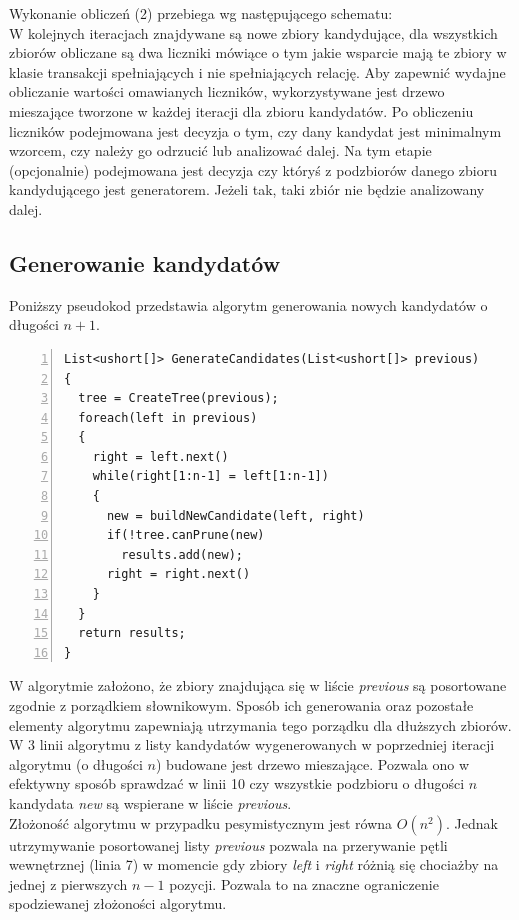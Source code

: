\documentclass[a4paper,12pt]{article}
\begin{document}
Wykonanie obliczeń (2) przebiega wg następującego schematu:\\

W kolejnych iteracjach znajdywane są nowe zbiory kandydujące, dla wszystkich zbiorów obliczane są dwa liczniki mówiące o tym jakie wsparcie mają te zbiory w klasie transakcji spełniających i nie spełniających relację. Aby zapewnić wydajne obliczanie wartości omawianych liczników, wykorzystywane jest drzewo mieszające tworzone w każdej iteracji dla zbioru kandydatów. Po obliczeniu liczników podejmowana jest decyzja o tym, czy dany kandydat
jest minimalnym wzorcem, czy należy go odrzucić lub analizować dalej. Na tym etapie (opcjonalnie) podejmowana jest decyzja czy któryś z podzbiorów danego zbioru kandydującego jest generatorem. Jeżeli tak, taki zbiór nie będzie analizowany dalej.
\subsection{Generowanie kandydatów}
Poniższy pseudokod przedstawia algorytm generowania nowych kandydatów o długości $n+1$. \\
\begin{center}
\begin{lstlisting}[numbers=left]
List<ushort[]> GenerateCandidates(List<ushort[]> previous)
{
  tree = CreateTree(previous);
  foreach(left in previous)
  {
    right = left.next()
    while(right[1:n-1] = left[1:n-1])
    {
      new = buildNewCandidate(left, right)
      if(!tree.canPrune(new)
        results.add(new);
      right = right.next()
    }
  }
  return results;
}
\end{lstlisting}
\end{center}

W algorytmie założono, że zbiory znajdująca się w liście \textit{previous} są posortowane zgodnie z porządkiem słownikowym. Sposób ich generowania oraz pozostałe elementy algorytmu zapewniają utrzymania tego porządku dla dłuższych zbiorów.
W 3 linii algorytmu z listy kandydatów wygenerowanych w poprzedniej iteracji algorytmu (o długości $n$) budowane jest drzewo mieszające. Pozwala ono w efektywny sposób sprawdzać w linii 10 czy wszystkie podzbioru o długości $n$ kandydata \textit{new} są wspierane w liście \textit{previous}. \\

Złożoność algorytmu w przypadku pesymistycznym jest równa $O(n^2)$. Jednak utrzymywanie posortowanej listy \textit{previous} pozwala na przerywanie pętli wewnętrznej (linia 7) w momencie gdy zbiory \textit{left} i \textit{right} różnią się chociażby na jednej z pierwszych $n-1$ pozycji. Pozwala to na znaczne ograniczenie spodziewanej złożoności algorytmu.
\end{document}
